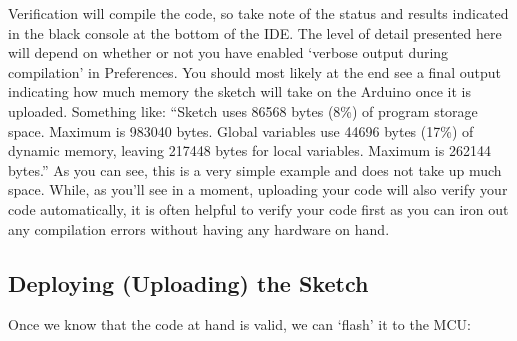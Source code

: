 \begin{enumerate}
   Verification will compile the code, so take note of the status and results indicated in the black console at the bottom of the IDE. The level of detail presented here will depend on whether or not you have enabled ‘verbose output during compilation’ in Preferences. You should most likely at the end see a final output indicating how much memory the sketch will take on the Arduino once it is uploaded. Something like: “Sketch uses 86568 bytes (8\%) of program storage space. Maximum is 983040 bytes. Global variables use 44696 bytes (17\%) of dynamic memory, leaving 217448 bytes for local variables. Maximum is 262144 bytes.” As you can see, this is a very simple example and does not take up much space. While, as you’ll see in a moment, uploading your code will also verify your code automatically, it is often helpful to verify your code first as you can iron out any compilation errors without having any hardware on hand.

\end{enumerate}

\subsection{Deploying (Uploading) the Sketch}

Once we know that the code at hand is valid, we can ‘flash’ it to the MCU:

